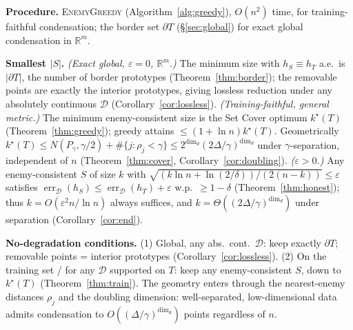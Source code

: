 \documentclass{amsart}
\theoremstyle{definition}
\DeclareMathOperator{\err}{err}
\begin{document}
\textbf{Procedure.} \textsc{EnemyGreedy} (Algorithm~\ref{alg:greedy}), $O(n^2)$
time, for training-faithful condensation; the border set $\partial T$
(\S\ref{sec:global}) for exact global condensation in $\mathbb R^m$.

\textbf{Smallest $|S|$.}
\emph{(Exact global, $\varepsilon=0$, $\mathbb R^m$.)} The minimum size with
$h_S\equiv h_T$ a.e.\ is $|\partial T|$, the number of border prototypes
(Theorem~\ref{thm:border}); the removable points are exactly the interior
prototypes, giving lossless reduction under any absolutely continuous
$\mathcal D$ (Corollary~\ref{cor:lossless}).
\emph{(Training-faithful, general metric.)} The minimum enemy-consistent size is
the Set Cover optimum $k^\star(T)$ (Theorem~\ref{thm:greedy}); greedy attains
$\le(1+\ln n)k^\star(T)$. Geometrically $k^\star(T)\le N(P_\gamma,\gamma/2)+
\#\{j:\rho_j<\gamma\}\le2^{\dim_d}(2\Delta/\gamma)^{\dim_d}$ under
$\gamma$-separation, independent of $n$ (Theorem~\ref{thm:cover},
Corollary~\ref{cor:doubling}).
\emph{($\varepsilon>0$.)} Any enemy-consistent $S$ of size $k$ with
$\sqrt{(k\ln n+\ln(2/\delta))/(2(n-k))}\le\varepsilon$ satisfies
$\err_\mathcal D(h_S)\le\err_\mathcal D(h_T)+\varepsilon$ w.p.\ $\ge1-\delta$
(Theorem~\ref{thm:honest}); thus $k=O(\varepsilon^2 n/\ln n)$ always suffices,
and $k=\Theta((2\Delta/\gamma)^{\dim_d})$ under separation
(Corollary~\ref{cor:end}).

\textbf{No-degradation conditions.} (1) Global, any abs.\ cont.\ $\mathcal D$:
keep exactly $\partial T$; removable points = interior prototypes
(Corollary~\ref{cor:lossless}). (2) On the training set / for any $\mathcal D$
supported on $T$: keep any enemy-consistent $S$, down to $k^\star(T)$
(Theorem~\ref{thm:train}). The geometry enters through the nearest-enemy
distances $\rho_j$ and the doubling dimension: well-separated, low-dimensional
data admits condensation to $O((\Delta/\gamma)^{\dim_d})$ points regardless of
$n$.
\end{document}
